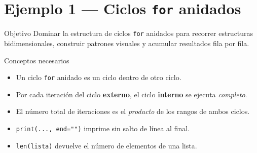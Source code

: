 \documentclass[12pt,a4paper]{article}
\begin{document}
\section{Ejemplo 1 — Ciclos \texttt{for} anidados}
\label{sec:ejemplo1}

\begin{objetivobox}{Objetivo}
Dominar la estructura de ciclos \texttt{for} anidados para recorrer estructuras
bidimensionales, construir patrones visuales y acumular resultados fila por fila.
\end{objetivobox}

\vspace{0.6em}
\begin{conceptobox}{Conceptos necesarios}
\begin{itemize}
  \item Un ciclo \texttt{for} anidado es un ciclo dentro de otro ciclo.
  \item Por cada iteración del ciclo \textbf{externo}, el ciclo \textbf{interno}
        se ejecuta \emph{completo}.
  \item El número total de iteraciones es el \emph{producto} de los rangos de ambos ciclos.
  \item \texttt{print(..., end="")} imprime sin salto de línea al final.
  \item \texttt{len(lista)} devuelve el número de elementos de una lista.
\end{itemize}
\end{conceptobox}
\end{document}
